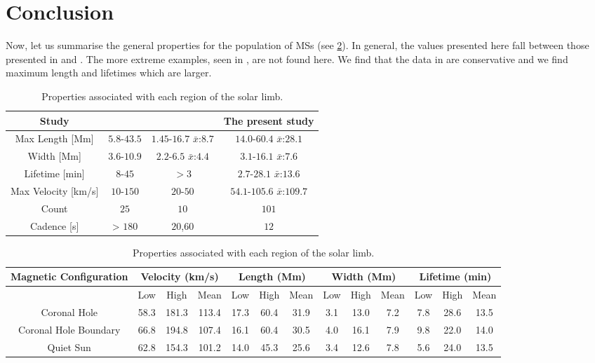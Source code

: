 \section{Conclusion}
\label{sec:conc1}
Now, let us summarise the general properties for the population of MSs (see \cref{table:final properties}). In general, the values presented here fall between those presented in \cite{Bohlin1975} and \cite{Dere89}. The more extreme examples, seen in \cite{Bohlin1975}, are not found here. We find that the data in \cite{Dere89} are conservative and we find maximum length and lifetimes which are larger. 


\begin{table}
	\centering
	\begin{tabular}{c c c c}
		\hline\hline
		Study & \cite{Bohlin1975} & \cite{Dere89} & The present study \\    
		\hline                                
		Max Length [Mm] & $5.8$-$43.5$ & $1.45$-$16.7$ $\bar{x}$:$8.7$ & $14.0$-$60.4$ $\bar{x}$:$28.1$ \\
		Width [Mm] & $3.6$-$10.9$ & $2.2$-$6.5$ $\bar{x}$:$4.4$ & $3.1$-$16.1$ $\bar{x}$:$7.6$ \\
		Lifetime [min] & $8$-$45$ & $> 3$ & $2.7$-$28.1$ $\bar{x}$:$13.6$ \\
		Max Velocity [km/s] & $10$-$150$ & $20$-$50$ & $54.1$-$105.6$ $\bar{x}$:$109.7$ \\
		Count & $25$ & $10$ & $101$ \\
		Cadence [s] & > $180$ & $20$,$60$ & $12$ \\
		\hline 
	\end{tabular}
	\caption{General properties table. Comparing the values given by \cite{Bohlin1975}, \cite{Dere89} and this study.}
	\bigskip\bigskip

	\begin{tabular}{|c|c|c|c|c|c|c|c|c|c|c|c|c|}
				\hline 
				Magnetic Configuration & \multicolumn{3}{c|}{Velocity (km/s)} & \multicolumn{3}{c|}{Length (Mm)} & \multicolumn{3}{c|}{Width (Mm)} & \multicolumn{3}{c|}{Lifetime (min)}\tabularnewline
				\hline 
				\hline 
				& \multicolumn{1}{c|}{Low} & High & Mean & Low & High & Mean & \multicolumn{1}{c|}{Low} & High & Mean & Low & High & Mean\tabularnewline
				\hline 
				Coronal Hole & 58.3 & 181.3 & 113.4 & 17.3 & 60.4 & 31.9 & 3.1 & 13.0 & 7.2 & 7.8 & 28.6 & 13.5\tabularnewline
				\hline 
				Coronal Hole Boundary & 66.8 & 194.8 & 107.4 & 16.1 & 60.4 & 30.5 & 4.0 & 16.1 & 7.9 & 9.8 & 22.0 & 14.0\tabularnewline
				\hline 
				Quiet Sun & 62.8 & 154.3 & 101.2 & 14.0 & 45.3 & 25.6 & 3.4 & 12.6 & 7.8 & 5.6 & 24.0 & 13.5\tabularnewline
				\hline 
	\end{tabular}
	\caption{Properties associated with each region of the solar limb.}
	\label{table:final properties}
	
\end{table}


